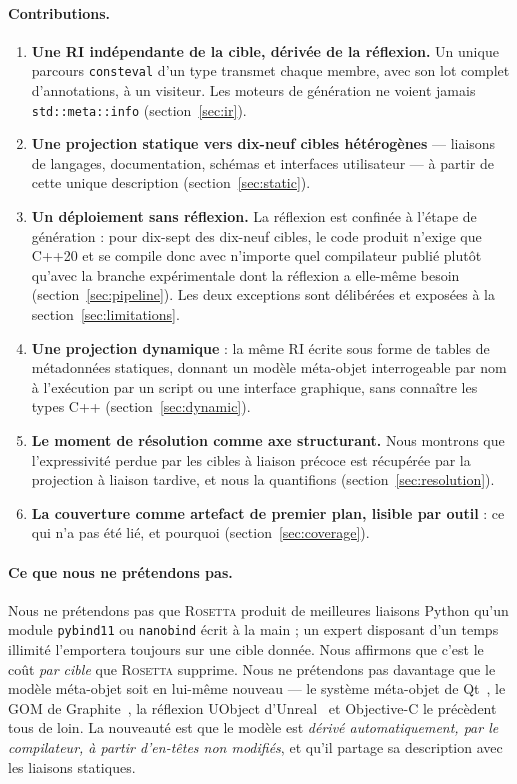 \documentclass[11pt,a4paper]{article}
\newcommand{\rosetta}{\textsc{Rosetta}}
\newcommand{\code}[1]{\texttt{\small #1}}
\begin{document}
\paragraph{Contributions.}
\begin{enumerate}
  \item \textbf{Une RI indépendante de la cible, dérivée de la réflexion.} Un
    unique parcours \code{consteval} d'un type transmet chaque membre, avec son
    lot complet d'annotations, à un visiteur. Les moteurs de génération ne
    voient jamais \code{std::meta::info} (section~\ref{sec:ir}).
  \item \textbf{Une projection statique vers dix-neuf cibles hétérogènes} ---
    liaisons de langages, documentation, schémas et interfaces utilisateur ---
    à partir de cette unique description (section~\ref{sec:static}).
  \item \textbf{Un déploiement sans réflexion.} La réflexion est confinée à
    l'étape de génération : pour dix-sept des dix-neuf cibles, le code produit
    n'exige que C++20 et se compile donc avec n'importe quel compilateur publié
    plutôt qu'avec la branche expérimentale dont la réflexion a elle-même besoin
    (section~\ref{sec:pipeline}). Les deux exceptions sont délibérées et
    exposées à la section~\ref{sec:limitations}.
  \item \textbf{Une projection dynamique} : la même RI écrite sous forme de
    tables de métadonnées statiques, donnant un modèle méta-objet interrogeable
    par nom à l'exécution par un script ou une interface graphique, sans
    connaître les types C++ (section~\ref{sec:dynamic}).
  \item \textbf{Le moment de résolution comme axe structurant.} Nous montrons
    que l'expressivité perdue par les cibles à liaison précoce est récupérée par
    la projection à liaison tardive, et nous la quantifions
    (section~\ref{sec:resolution}).
  \item \textbf{La couverture comme artefact de premier plan, lisible par
    outil} : ce qui n'a pas été lié, et pourquoi (section~\ref{sec:coverage}).
\end{enumerate}

\paragraph{Ce que nous ne prétendons pas.}
Nous ne prétendons pas que \rosetta{} produit de meilleures liaisons Python
qu'un module \code{pybind11} ou \code{nanobind} écrit à la main ; un expert disposant d'un temps
illimité l'emportera toujours sur une cible donnée. Nous affirmons que c'est le
coût \emph{par cible} que \rosetta{} supprime. Nous ne prétendons pas davantage
que le modèle méta-objet soit en lui-même nouveau --- le système méta-objet de
Qt~\cite{qt}, le GOM de Graphite~\cite{graphite}, la réflexion UObject
d'Unreal~\cite{unreal} et Objective-C le précèdent tous de loin. La nouveauté
est
que le modèle est \emph{dérivé automatiquement, par le compilateur, à partir
d'en-têtes non modifiés}, et qu'il partage sa description avec les liaisons
statiques.
\end{document}
